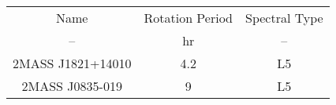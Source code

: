 \begin{table}
\begin{tabular}{ccc}
Name & Rotation Period & Spectral Type \\
-- & hr & -- \\
2MASS J1821+14010 & 4.2 & L5 \\
2MASS J0835-019 & 9 & L5 \\
\end{tabular}
\end{table}
